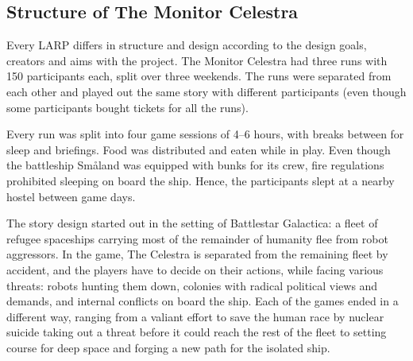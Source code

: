 \subsection{Structure of The Monitor Celestra}
Every LARP differs in structure and design according to the design goals, creators and aims with the project. The Monitor Celestra had three runs with 150 participants each, split over three weekends. The runs were separated from each other and played out the same story with different participants (even though some participants bought tickets for all the runs). 

Every run was split into four game sessions of 4--6 hours, with breaks between for sleep and briefings. Food was distributed and eaten while in play. Even though the battleship Småland was equipped with bunks for its crew, fire regulations prohibited sleeping on board the ship. Hence, the participants slept at a nearby hostel between game days.

The story design started out in the setting of Battlestar Galactica: a fleet of refugee spaceships carrying most of the remainder of humanity flee from robot aggressors. In the game, The Celestra is separated from the remaining fleet by accident, and the players have to decide on their actions, while facing various threats: robots hunting them down, colonies with radical political views and demands, and internal conflicts on board the ship. Each of the games ended in a different way, ranging from a valiant effort to save the human race by nuclear suicide taking out a threat before it could reach the rest of the fleet to setting course for deep space and forging a new path for the isolated ship.



